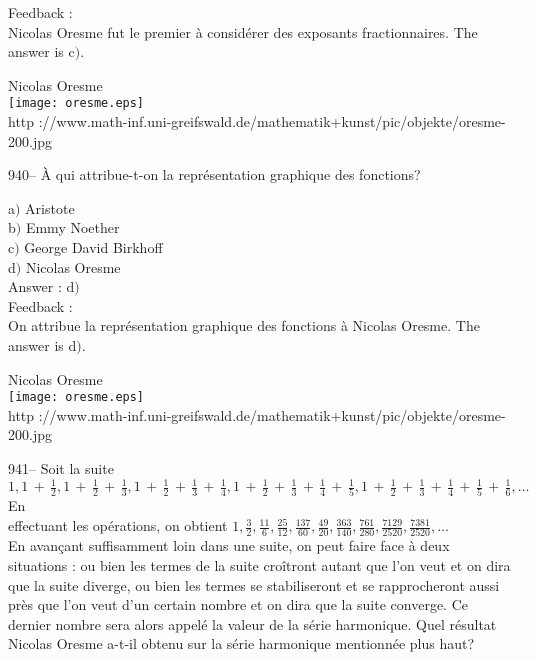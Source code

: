 \documentclass[letterpaper, 12pt]{article}
\begin{document}
Feedback : \\
Nicolas Oresme fut le premier \`a consid\'erer des exposants
fractionnaires. The answer is c$)$.\\

        \begin{center}
        Nicolas Oresme\\
    \texttt{[image: oresme.eps]}\\
        {\footnotesize http
://www.math-inf.uni-greifswald.de/mathematik+kunst/pic/objekte/oresme-200.jpg}
    \end{center}

940-- \`A qui attribue-t-on la repr\'esentation graphique des
fonctions?

a$)$ Aristote \\
b$)$ Emmy Noether \\
c$)$ George David Birkhoff \\
d$)$ Nicolas Oresme\\

Answer : d$)$\\

Feedback : \\
On attribue la repr\'esentation graphique des fonctions \`a Nicolas Oresme.
The answer is d$)$.\\

        \begin{center}
        Nicolas Oresme\\
    \texttt{[image: oresme.eps]}\\
        {\footnotesize http
://www.math-inf.uni-greifswald.de/mathematik+kunst/pic/objekte/oresme-200.jpg}
    \end{center}

941-- Soit la suite
$1,1\,+\,\frac12,1\,+\,\frac12\,+\,\frac13,1\,+\,\frac12\,+\,\frac13\,+\,\frac14,1\,+\,\frac12\,+\,\frac13\,+\,\frac14\,+\,\frac15,
1\,+\,\frac12\,+\,\frac13\,+\,\frac14\,+\,\frac15\,+\,\frac16,\ldots$ En \\
[2mm] effectuant les op\'erations, on obtient
$1,\frac32,\frac{11}6,\frac{25}{12},\frac{137}{60},\frac{49}{20},
\frac{363}{140},\frac{761}{280},\frac{7129}{2520},\frac{7381}{2520},\ldots$
\\ [2mm] En avan\c cant suffisamment loin dans une suite, on peut
faire face \`a deux situations : ou bien les termes de la suite
cro\^itront autant que l'on veut et on dira que la suite diverge, ou
bien les termes se stabiliseront et se rapprocheront aussi pr\`es
que l'on veut d'un certain nombre et on dira que la suite converge.
Ce dernier nombre sera alors appel\'e la valeur de la s\'erie
harmonique. Quel r\'esultat Nicolas Oresme a-t-il obtenu sur la
s\'erie harmonique mentionn\'ee plus haut?
\end{document}
